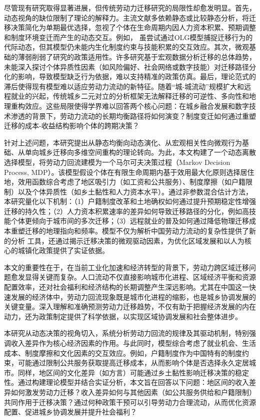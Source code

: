 \documentclass[
  a4paper,
  zihao=-4,
  fontset=mac,
  AutoFakeBold,
  AutoFakeSlant,
  oneside]{ctexbook}
\begin{document}
尽管现有研究取得显著进展，但传统劳动力迁移研究的局限性却愈发明显。首先，动态视角的缺位限制了理论的解释力。主流文献多依赖静态或比较静态分析，将迁移决策简化为单期最优选择，忽视了个体在生命周期内因人力资本积累、预期调整和制度环境变迁而产生的动态交互。例如，
\textcite{HanQiHengNongCunLaoDongLiQianYiMoCaYingXiangNongMinGongShuLiangYuGongZiJieGouMa2018}虽尝试通过OLG模型捕捉迁移行为的代际动态，但其模型仍未能内生化制度约束与技能积累的交互效应。其次，微观基础的薄弱削弱了研究的政策适用性。许多研究基于宏观数据分析迁移的总体趋势，未能深入探讨个体异质性因素（如风险偏好、社会网络或数字技能）对迁移路径分化的影响，导致模型缺乏行为依据，难以支持精准的政策仿真。最后，理论范式的滞后使得现有模型难以适应劳动力流动的新特征。随着“城-城流动”规模扩大和远程就业的兴起，传统城乡二元对立的分析框架无法解释迁移的可逆性、多向性和地理重构效应。这些局限使得学界难以回答两个核心问题：在城乡融合发展和数字技术渗透的背景下，劳动力流动的长期均衡路径将如何演变？制度变迁如何通过重塑迁移的成本-收益结构影响个体的跨期决策？

针对上述问题，本研究提出从静态均衡向动态演化、从宏观相关性向微观行为基础、从单向城乡迁移向多维空间重构的理论转向。为此，本文构建了一个动态离散选择模型，将劳动力回流建模为一个马尔可夫决策过程（Markov Decision Process, MDP）。该模型假设个体在有限生命周期内基于效用最大化原则选择居住地，效用函数综合考虑了地区吸引力（如工资和公共服务）、制度摩擦（如户籍限制）以及个体异质性（如乡土黏性和人力资本水平）。通过非参数混合估计方法，本研究量化以下机制：（1）户籍制度改革和土地确权如何通过提升预期稳定性增强迁移的持久性；（2）人力资本积累速率的差异如何导致迁移路径的分化，例如高技能个体更倾向于城市间的多次迁移；（3）远程就业的普及如何通过降低物理迁移成本重塑迁移的地理指向和频率。模型不仅为解析中国劳动力流动的复杂性提供了新的分析 工具，还通过揭示迁移决策的微观驱动因素，为优化区域发展和以人为核心的城镇化政策提供了实证依据。

本文的重要性在于，在当前工业化加速和经济转型的背景下，劳动力跨区域迁移问题愈发显得关键而复杂。人口流动不仅直接影响城市化进程、区域经济平衡和资源配置效率，还对社会福利和经济结构的长期调整产生深远影响。尤其在中国这一快速发展的经济体中，劳动力回流现象既是城市化进程的缩影，也是城乡协调发展的关键变量。深入理解和准确预测劳动力迁移趋势，不仅有助于把握经济发展的内在动力，还为政策制定提供了科学依据，以实现区域协调发展和社会整体进步。

本研究从动态决策的视角切入，系统分析劳动力回流的规律及其驱动机制，特别强调收入差异作为核心经济因素的作用。与此同时，模型综合考虑了就业机会、生活成本、制度摩擦和文化因素的交互效应。例如，户籍制度作为中国特有的制度约束，可能通过限制公共服务获取提高迁移成本，从而影响个体是否选择永久定居城市。同样，地区间的文化差异（如方言）可能通过乡土黏性影响迁移决策的稳定性。通过构建理论模型并结合实证分析，本文旨在回答以下问题：地区间的收入差异如何激发劳动力迁移？收入差异如何与其他因素（如公共服务供给和户籍限制）共同作用于迁移决策？通过何种政策干预可以引导劳动力合理流动，从而优化资源配置、促进城乡协调发展并提升社会福利？
\end{document}
